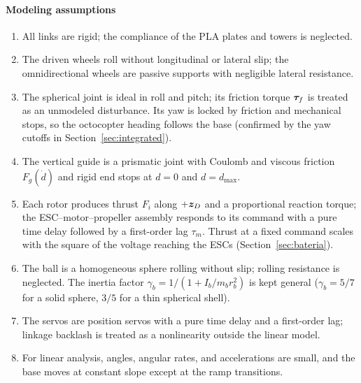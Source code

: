 \paragraph{Modeling assumptions}
\begin{enumerate}[label=\textbf{A\arabic*.}, leftmargin=*]
  \item All links are rigid; the compliance of the PLA plates and towers is neglected.
  \item The driven wheels roll without longitudinal or lateral slip; the omnidirectional wheels are passive supports with negligible lateral resistance.
  \item The spherical joint is ideal in roll and pitch; its friction torque $\bm{\tau}_f$ is treated as an unmodeled disturbance. Its yaw is locked by friction and mechanical stops, so the octocopter heading follows the base (confirmed by the yaw cutoffs in Section~\ref{sec:integrated}).
  \item The vertical guide is a prismatic joint with Coulomb and viscous friction $F_g(\dot d)$ and rigid end stops at $d=0$ and $d=d_{\max}$.
  \item Each rotor produces thrust $F_i$ along $+\bm{z}_D$ and a proportional reaction torque; the ESC--motor--propeller assembly responds to its command with a pure time delay followed by a first-order lag $\tau_m$. Thrust at a fixed command scales with the square of the voltage reaching the ESCs (Section~\ref{sec:bateria}).
  \item The ball is a homogeneous sphere rolling without slip; rolling resistance is neglected. The inertia factor $\gamma_b=1/(1+I_b/m_br_b^2)$ is kept general ($\gamma_b=5/7$ for a solid sphere, $3/5$ for a thin spherical shell).
  \item The servos are position servos with a pure time delay and a first-order lag; linkage backlash is treated as a nonlinearity outside the linear model.
  \item For linear analysis, angles, angular rates, and accelerations are small, and the base moves at constant slope except at the ramp transitions.
\end{enumerate}

